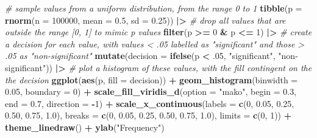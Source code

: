 \documentclass[
]{article}
\newenvironment{Shaded}{\begin{snugshade}}{\end{snugshade}}
\newcommand{\AttributeTok}[1]{\textcolor[rgb]{0.13,0.29,0.53}{#1}}
\newcommand{\CommentTok}[1]{\textcolor[rgb]{0.56,0.35,0.01}{\textit{#1}}}
\newcommand{\DecValTok}[1]{\textcolor[rgb]{0.00,0.00,0.81}{#1}}
\newcommand{\FloatTok}[1]{\textcolor[rgb]{0.00,0.00,0.81}{#1}}
\newcommand{\FunctionTok}[1]{\textcolor[rgb]{0.13,0.29,0.53}{\textbf{#1}}}
\newcommand{\NormalTok}[1]{#1}
\newcommand{\SpecialCharTok}[1]{\textcolor[rgb]{0.81,0.36,0.00}{\textbf{#1}}}
\newcommand{\StringTok}[1]{\textcolor[rgb]{0.31,0.60,0.02}{#1}}
\begin{document}
\begin{Shaded}
\begin{Highlighting}[]
\CommentTok{\# sample values from a uniform distribution, from the range 0 to 1}
\FunctionTok{tibble}\NormalTok{(}\AttributeTok{p =} \FunctionTok{rnorm}\NormalTok{(}\AttributeTok{n =} \DecValTok{100000}\NormalTok{, }\AttributeTok{mean =} \FloatTok{0.5}\NormalTok{, }\AttributeTok{sd =} \FloatTok{0.25}\NormalTok{)) }\SpecialCharTok{|\textgreater{}}
  \CommentTok{\# drop all values that are outside the range [0, 1] to mimic p values}
  \FunctionTok{filter}\NormalTok{(p }\SpecialCharTok{\textgreater{}=} \DecValTok{0} \SpecialCharTok{\&}\NormalTok{ p }\SpecialCharTok{\textless{}=} \DecValTok{1}\NormalTok{) }\SpecialCharTok{|\textgreater{}}
  \CommentTok{\# create a decision for each value, with values \textless{} .05 labelled as "significant" and those \textgreater{} .05 as "non{-}significant"}
  \FunctionTok{mutate}\NormalTok{(}\AttributeTok{decision =} \FunctionTok{ifelse}\NormalTok{(p }\SpecialCharTok{\textless{}}\NormalTok{ .}\DecValTok{05}\NormalTok{, }\StringTok{"significant"}\NormalTok{, }\StringTok{"non{-}significant"}\NormalTok{)) }\SpecialCharTok{|\textgreater{}}
  \CommentTok{\# plot a histogram of these values, with the fill contingent on the the decision}
  \FunctionTok{ggplot}\NormalTok{(}\FunctionTok{aes}\NormalTok{(p, }\AttributeTok{fill =}\NormalTok{ decision)) }\SpecialCharTok{+}
  \FunctionTok{geom\_histogram}\NormalTok{(}\AttributeTok{binwidth =} \FloatTok{0.05}\NormalTok{, }\AttributeTok{boundary =} \DecValTok{0}\NormalTok{) }\SpecialCharTok{+}
  \FunctionTok{scale\_fill\_viridis\_d}\NormalTok{(}\AttributeTok{option =} \StringTok{"mako"}\NormalTok{, }\AttributeTok{begin =} \FloatTok{0.3}\NormalTok{, }\AttributeTok{end =} \FloatTok{0.7}\NormalTok{, }\AttributeTok{direction =} \SpecialCharTok{{-}}\DecValTok{1}\NormalTok{) }\SpecialCharTok{+}
  \FunctionTok{scale\_x\_continuous}\NormalTok{(}\AttributeTok{labels =} \FunctionTok{c}\NormalTok{(}\DecValTok{0}\NormalTok{, }\FloatTok{0.05}\NormalTok{, }\FloatTok{0.25}\NormalTok{, }\FloatTok{0.50}\NormalTok{, }\FloatTok{0.75}\NormalTok{, }\FloatTok{1.0}\NormalTok{),}
                     \AttributeTok{breaks =} \FunctionTok{c}\NormalTok{(}\DecValTok{0}\NormalTok{, }\FloatTok{0.05}\NormalTok{, }\FloatTok{0.25}\NormalTok{, }\FloatTok{0.50}\NormalTok{, }\FloatTok{0.75}\NormalTok{, }\FloatTok{1.0}\NormalTok{), }
                     \AttributeTok{limits =} \FunctionTok{c}\NormalTok{(}\DecValTok{0}\NormalTok{, }\DecValTok{1}\NormalTok{)) }\SpecialCharTok{+}
  \FunctionTok{theme\_linedraw}\NormalTok{() }\SpecialCharTok{+}
  \FunctionTok{ylab}\NormalTok{(}\StringTok{"Frequency"}\NormalTok{)}
\end{Highlighting}
\end{Shaded}
\end{document}
